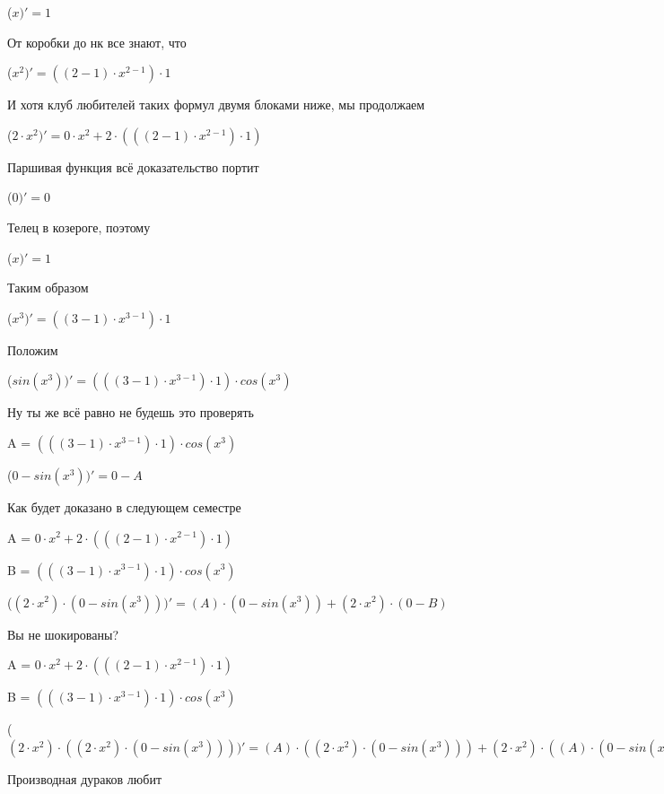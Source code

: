 \documentclass[12pt,a4paper,fleqn]{article}
\begin{document}
\begin{center}
 ($x)'
  = 1$\end{center}
От коробки до нк все знают, что

\begin{center}
 ($x^{2})'
  = ((2-1) \cdot x^{2-1}) \cdot 1$\end{center}
И хотя клуб любителей таких формул двумя блоками ниже, мы продолжаем

\begin{center}
 ($2 \cdot x^{2})'
  = 0 \cdot x^{2}+2 \cdot (((2-1) \cdot x^{2-1}) \cdot 1)$\end{center}
Паршивая функция всё доказательство портит\cite{link2}

\begin{center}
 ($0)'
  = 0$\end{center}
Телец в козероге, поэтому

\begin{center}
 ($x)'
  = 1$\end{center}
Таким образом

\begin{center}
 ($x^{3})'
  = ((3-1) \cdot x^{3-1}) \cdot 1$\end{center}
Положим

\begin{center}
 ($sin(x^{3}))'
  = (((3-1) \cdot x^{3-1}) \cdot 1) \cdot cos(x^{3})$\end{center}
Ну ты же всё равно не будешь это проверять

\begin{center}
A = $(((3-1) \cdot x^{3-1}) \cdot 1) \cdot cos(x^{3})$\end{center}
\begin{center}
 ($0-sin(x^{3}))'
  = 0-A$\end{center}
Как будет доказано в следующем семестре

\begin{center}
A = $0 \cdot x^{2}+2 \cdot (((2-1) \cdot x^{2-1}) \cdot 1)$\end{center}
\begin{center}
B = $(((3-1) \cdot x^{3-1}) \cdot 1) \cdot cos(x^{3})$\end{center}
\begin{center}
 ($(2 \cdot x^{2}) \cdot (0-sin(x^{3})))'
  = (A) \cdot (0-sin(x^{3}))+(2 \cdot x^{2}) \cdot (0-B)$\end{center}
Вы не шокированы?\cite{link3}

\begin{center}
A = $0 \cdot x^{2}+2 \cdot (((2-1) \cdot x^{2-1}) \cdot 1)$\end{center}
\begin{center}
B = $(((3-1) \cdot x^{3-1}) \cdot 1) \cdot cos(x^{3})$\end{center}
\begin{center}
 ($(2 \cdot x^{2}) \cdot ((2 \cdot x^{2}) \cdot (0-sin(x^{3}))))'
  = (A) \cdot ((2 \cdot x^{2}) \cdot (0-sin(x^{3})))+(2 \cdot x^{2}) \cdot ((A) \cdot (0-sin(x^{3}))+(2 \cdot x^{2}) \cdot (0-B))$\end{center}
Производная дураков любит\cite{link2}
\end{document}
